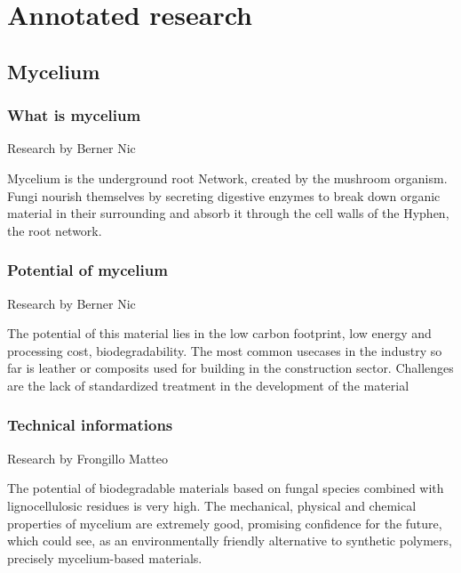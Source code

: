 \documentclass{article}
\begin{document}
\tableofcontents
\thispagestyle{empty}

\newpage
\section{Annotated research}
\subsection{Mycelium}
\subsubsection{What is mycelium}
{\small Research by Berner Nic}

Mycelium is the underground root Network, created by the mushroom
organism. Fungi nourish themselves by secreting digestive enzymes to
break down organic material in their surrounding and absorb it
through the cell walls of the Hyphen, the root network.\\


\subsubsection{Potential of mycelium}
{\small Research by Berner Nic}

The potential of this material lies in the low  carbon footprint, low
energy and processing cost, biodegradability. The most common usecases
in the industry so far is leather or composits used for building in
the construction sector. Challenges are the lack of standardized
treatment in the development of the material\\


\subsubsection{Technical informations}
{\small Research by Frongillo Matteo}

The potential of biodegradable materials based on fungal species combined with
lignocellulosic residues is very high. The mechanical, physical and chemical
properties of mycelium are extremely good, promising confidence for the future, which
could see, as an environmentally friendly alternative to synthetic polymers, precisely
mycelium-based materials.\\

\end{document}
